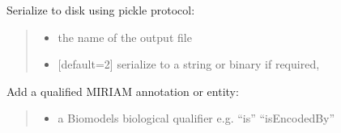 \documentclass[letterpaper,12pt,english]{sphinxmanual}
\begin{document}
\begin{fulllineitems}
\begin{fulllineitems}
\begin{quote}
\begin{description}
\end{description}\end{quote}

\end{fulllineitems}


\begin{fulllineitems}
\label{\detokenize{api/core:cbmpy.CBModel.Fbase.serializeToDisk}}
\pysigstartsignatures
\pysiglinewithargsret
{}
{\sphinxparamcomma {}}
{}
\pysigstopsignatures
\sphinxAtStartPar
Serialize to disk using pickle protocol:
\begin{quote}\begin{description}
\begin{itemize}
\item {} 
\sphinxAtStartPar
{} \textendash{} the name of the output file

\item {} 
\sphinxAtStartPar
{} \textendash{} {[}default=2{]} serialize to a string or binary if required,

\end{itemize}

\end{description}\end{quote}

\end{fulllineitems}


\begin{fulllineitems}
\label{\detokenize{api/core:cbmpy.CBModel.Fbase.addMIRIAMannotation}}
\pysigstartsignatures
\pysiglinewithargsret
{}
{\sphinxparamcomma {}\sphinxparamcomma {}}
{}
\pysigstopsignatures
\sphinxAtStartPar
Add a qualified MIRIAM annotation or entity:
\begin{quote}\begin{description}
\begin{itemize}
\item {} 
\sphinxAtStartPar
{} \textendash{} a Biomodels biological qualifier e.g. “is” “isEncodedBy”


\end{itemize}
\end{description}
\end{quote}
\end{fulllineitems}
\end{fulllineitems}
\end{document}
